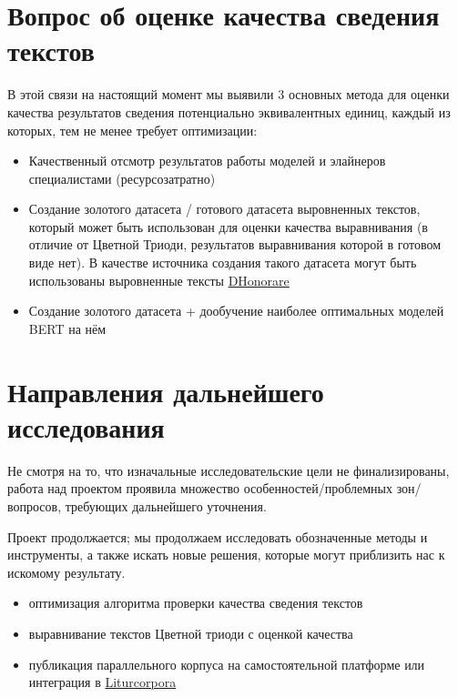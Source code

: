 \documentclass[
  letterpaper,
]{book}
\providecommand{\tightlist}{%
  \setlength{\itemsep}{0pt}\setlength{\parskip}{0pt}}\usepackage{longtable,booktabs,array}
\begin{document}

\hypertarget{sec-about_evluation}{%
\chapter{Вопрос об оценке качества сведения
текстов}\label{sec-about_evluation}}

В этой связи на настоящий момент мы выявили 3 основных метода для оценки
качества результатов сведения потенциально эквивалентных единиц, каждый
из которых, тем не менее требует оптимизации:

\begin{itemize}
\tightlist
\item
  Качественный отсмотр результатов работы моделей и элайнеров
  специалистами (ресурсозатратно)
\item
  Создание золотого датасета / готового датасета выровненных текстов,
  который может быть использован для оценки качества выравнивания (в
  отличие от Цветной Триоди, результатов выравнивания которой в готовом
  виде нет). В качестве источника создания такого датасета могут быть
  использованы выровненные тексты
  \href{https://dhonorare.ru/texts/trebnik/molitvy-v-pervyy-den-posle-rozhdeniya-mladentsa}{DHonorare}
\item
  Создание золотого датасета + дообучение наиболее оптимальных моделей
  BERT на нём
\end{itemize}


\hypertarget{ux43dux430ux43fux440ux430ux432ux43bux435ux43dux438ux44f-ux434ux430ux43bux44cux43dux435ux439ux448ux435ux433ux43e-ux438ux441ux441ux43bux435ux434ux43eux432ux430ux43dux438ux44f}{%
\chapter{Направления дальнейшего
исследования}\label{ux43dux430ux43fux440ux430ux432ux43bux435ux43dux438ux44f-ux434ux430ux43bux44cux43dux435ux439ux448ux435ux433ux43e-ux438ux441ux441ux43bux435ux434ux43eux432ux430ux43dux438ux44f}}

Не смотря на то, что изначальные исследовательские цели не
финализированы, работа над проектом проявила множество
особенностей/проблемных зон/вопросов, требующих дальнейшего уточнения.

Проект продолжается; мы продолжаем исследовать обозначенные методы и
инструменты, а также искать новые решения, которые могут приблизить нас
к искомому результату.

\begin{itemize}
\tightlist
\item
  оптимизация алгоритма проверки качества сведения текстов
\item
  выравнивание текстов Цветной триоди с оценкой качества
\item
  публикация параллельного корпуса на самостоятельной платформе или
  интеграция в \href{https://liturcorpora.ru/}{Liturcorpora}
\end{itemize}


\backmatter
\end{document}

